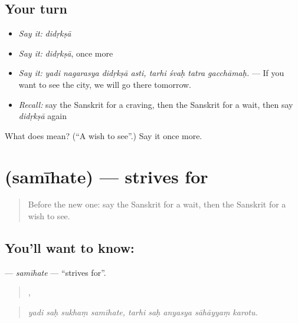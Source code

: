 \subsection*{Your turn}
\begin{itemize}
\raggedright
  \item \emph{Say it:} \emph{didṛkṣā}
  \item \emph{Say it:} \emph{didṛkṣā}, once more
  \item \emph{Say it:} \emph{yadi nagarasya didṛkṣā asti, tarhi śvaḥ tatra gacchāmaḥ.} — If you want to see the city, we will go there tomorrow.
  \item \emph{Recall:} say the Sanskrit for a craving, then the Sanskrit for a wait, then say \emph{didṛkṣā} again
\end{itemize}

\begin{tcolorbox}[breakable,colback=teal!4,colframe=teal!35!black,title={Before you move on}]
What does  mean? (\textquotedblleft{}A wish to see\textquotedblright{}.) Say it once more.
\end{tcolorbox}
\section[\texorpdfstring{\sk{समीहते} (samīhate)}{समीहते (samīhate)}]{ (samīhate) — strives for}

\label{lesson:SA-C549-samihate}



\begin{quote}
Before the new one: say the Sanskrit for a wait, then the Sanskrit for a wish to see.
\end{quote}

\subsection*{You'll want to know: }
\textbf{} — \emph{samīhate} — \textquotedblleft{}strives for\textquotedblright{}.

\begin{quote}
   ,     
\end{quote}

\begin{quote}
\emph{yadi saḥ sukhaṃ samīhate, tarhi saḥ anyasya sāhāyyaṃ karotu.}
\end{quote}

